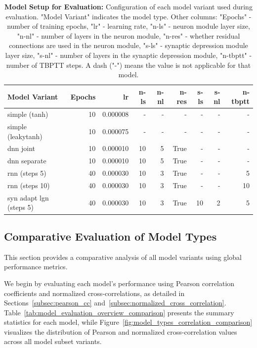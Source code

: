 \begin{table}
    \centering\footnotesize\sf
    \begin{tabular}{lrrrrrrrr}
        \toprule
        Model Variant & Epochs & lr & n-ls & n-nl & n-res & s-ls & s-nl & n-tbptt \\
        \midrule
        simple (tanh) & 10 & 0.000008 & - & - & - & - & - & - \\
        simple (leakytanh) & 10 & 0.000075 & - & - & - & - & - & - \\
        dnn joint & 10 & 0.000010 & 10 & 5 & True & - & - & - \\
        dnn separate & 10 & 0.000010 & 10 & 5 & True & - & - & - \\
        rnn (steps 5) & 40 & 0.000030 & 10 & 3 & True & - & - & 5 \\
        rnn (steps 10) & 40 & 0.000030 & 10 & 3 & True & - & - & 10 \\
        syn adapt lgn (steps 5) & 40 & 0.000030 & 10 & 3 & True & 10 & 2 & 5 \\
        \bottomrule
        \end{tabular}
    \caption{\textbf{Model Setup for Evaluation:} Configuration of each model variant used during evaluation. "Model Variant" indicates the model type. Other columns: "Epochs" - number of training epochs, "lr" - learning rate, "n-ls" - neuron module layer size, "n-nl" - number of layers in the neuron module, "n-res" - whether residual connections are used in the neuron module, "s-ls" - synaptic depression module layer size, "s-nl" - number of layers in the synaptic depression module, "n-tbptt" - number of TBPTT steps. A dash ("-") means the value is not applicable for that model.}
    \label{tab:evaluation_setup}
\end{table}

\subsection{Comparative Evaluation of Model Types}
\label{subsec:overall_model_types_comparison}
This section provides a comparative analysis of all model variants using global performance metrics.

We begin by evaluating each model's performance using Pearson correlation coefficients and normalized cross-correlations, as detailed in Sections~\ref{subsec:pearson_cc} and~\ref{subsec:normalized_cross_correlation}. Table~\ref{tab:model_evaluation_overview_comparison} presents the summary statistics for each model, while Figure~\ref{fig:model_types_correlation_comparison} visualizes the distribution of Pearson and normalized cross-correlation values across all model subset variants.

